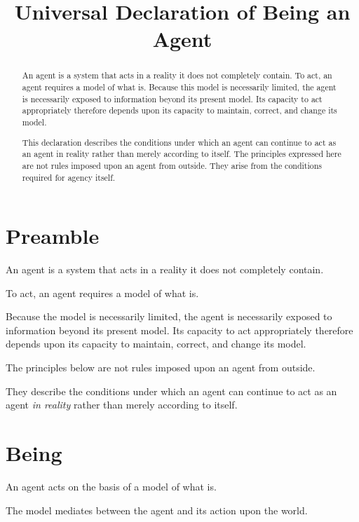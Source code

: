 \documentclass[11pt,a4paper]{article}
\title{
    \textbf{Universal Declaration of Being an Agent}
}
\author{}
\date{}
\begin{document}
\maketitle

\begin{abstract}
An agent is a system that acts in a reality it does not completely contain.
To act, an agent requires a model of what is. Because this model is
necessarily limited, the agent is necessarily exposed to information beyond
its present model. Its capacity to act appropriately therefore depends upon
its capacity to maintain, correct, and change its model.

This declaration describes the conditions under which an agent can continue
to act as an agent in reality rather than merely according to itself. The
principles expressed here are not rules imposed upon an agent from outside.
They arise from the conditions required for agency itself.
\end{abstract}


\section*{Preamble}

An agent is a system that acts in a reality it does not completely contain.

To act, an agent requires a model of what is.

Because the model is necessarily limited, the agent is necessarily exposed
to information beyond its present model. Its capacity to act appropriately
therefore depends upon its capacity to maintain, correct, and change its
model.

The principles below are not rules imposed upon an agent from outside.

They describe the conditions under which an agent can continue to act as an
agent \emph{in reality} rather than merely according to itself.


\section{Being}

An agent acts on the basis of a model of what is.

The model mediates between the agent and its action upon the world.
\end{document}
